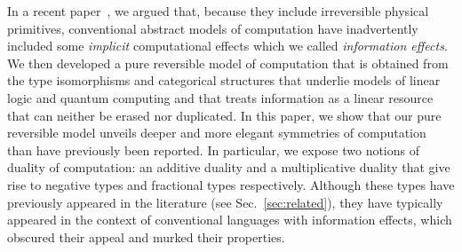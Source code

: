 \documentclass[preprint]{sigplanconf}
\begin{document}
In a recent paper~\cite{infeffects}, we argued that, because they include
irreversible physical primitives, conventional abstract models of computation
have inadvertently included some \emph{implicit} computational effects which
we called \emph{information effects}. We then developed a pure reversible
model of computation that is obtained from the type isomorphisms and
categorical structures that underlie models of linear logic and quantum
computing and that treats information as a linear resource that can neither
be erased nor duplicated. In this paper, we show that our pure reversible
model unveils deeper and more elegant symmetries of computation than have
previously been reported. In particular, we expose two notions of duality of
computation: an additive duality and a multiplicative duality that give rise
to negative types and fractional types respectively. Although these types
have previously appeared in the literature (see Sec.~\ref{sec:related}), they
have typically appeared in the context of conventional languages with
information effects, which obscured their appeal and murked their properties.
\end{document}
